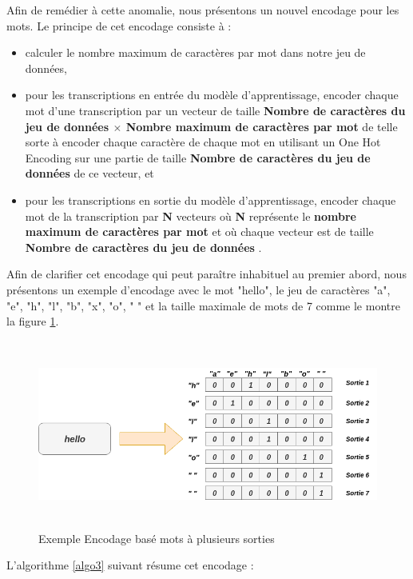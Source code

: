 Afin de remédier à cette anomalie, nous présentons un nouvel encodage pour les mots. Le principe de cet encodage consiste à :
\begin{itemize}
    \item calculer le nombre maximum de caractères par mot dans notre jeu de données,
    \item pour les transcriptions en entrée du modèle d'apprentissage, encoder chaque mot d'une transcription par un vecteur de taille \textbf{\og Nombre de caractères du jeu de données $\times$ Nombre maximum de caractères par mot \fg} de telle sorte à encoder chaque caractère de chaque mot en utilisant un One Hot Encoding sur une partie de taille \textbf{{Nombre de caractères du jeu de données}} de ce vecteur, et
    \item pour les transcriptions en sortie du modèle d'apprentissage, encoder chaque mot de la transcription par \textbf{N} vecteurs où \textbf{N} représente le \textbf{nombre maximum de caractères par mot} et où chaque vecteur est de taille \textbf{\og Nombre de caractères du jeu de données \fg}.\\ 
\end{itemize}

Afin de clarifier cet encodage qui peut paraître inhabituel au premier abord, nous présentons un exemple d'encodage avec le mot "hello", le jeu de caractères "a", "e", "h", "l", "b", "x", "o", " " et la taille maximale de mots de 7 comme le montre la figure \ref{word_based_multiple_output}.

 \begin{figure}[H]
    \centering
    \includegraphics[height=175pt,width=350pt]{images/chap3/encodage_base_mots.png}
    \caption{Exemple Encodage basé mots à plusieurs sorties}
    \label{word_based_multiple_output}
\end{figure}

L'algorithme \ref{algo3} suivant résume cet encodage :

